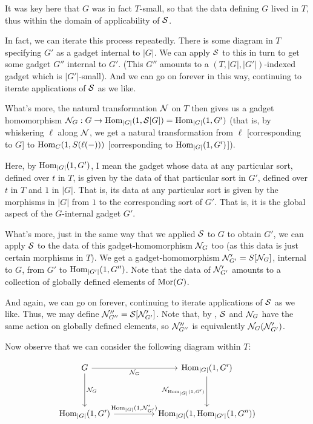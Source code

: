 \begin{observation}
It was key here that $G$ was in fact $T$-small, so that the data defining $G$ lived in $T$, thus within the domain of applicability of $\mathcal{S}$.

In fact, we can iterate this process repeatedly. There is some diagram in $T$ specifying $G'$ as a gadget internal to $|G|$. We can apply $\mathcal{S}$ to this in turn to get some gadget $G''$ internal to $G'$. (This $G''$ amounts to a $(T, |G|, |G'|)$-indexed gadget which is $|G'|$-small). And we can go on forever in this way, continuing to iterate applications of $\mathcal{S}$ as we like.

What's more, the natural transformation $\mathcal{N}$ on $T$ then gives us a gadget homomorphism $\mathcal{N}_G : G \to \operatorname{Hom}_{|G|}(1, \mathcal{S}[G]) = \operatorname{Hom}_{|G|}(1, G')$ (that is, by whiskering $\ell$ along $\mathcal{N}$, we get a natural transformation from $\ell$ [corresponding to $G$] to $\operatorname{Hom}_C(1, S(\ell(-)))$ [corresponding to $\operatorname{Hom}_{|G|}(1, G')$]).

Here, by $\operatorname{Hom}_{|G|}(1, G')$, I mean the gadget whose data at any particular sort, defined over $t$ in $T$, is given by the data of that particular sort in $G'$, defined over $t$ in $T$ and $1$ in $|G|$. That is, its data at any particular sort is given by the morphisms in $|G|$ from $1$ to the corresponding sort of $G'$. That is, it is the global aspect of the $G$-internal gadget $G'$.

What's more, just in the same way that we applied $\mathcal{S}$ to $G$ to obtain $G'$, we can apply $\mathcal{S}$ to the data of this gadget-homomorphism $\mathcal{N}_G$ too (as this data is just certain morphisms in $T$). We get a gadget-homomorphism $\mathcal{N}'_{G'} = S[\mathcal{N}_G]$, internal to $G$, from $G'$ to $\operatorname{Hom}_{|G'|}(1, G'')$. Note that the data of $\mathcal{N}'_{G'}$ amounts to a collection of globally defined elements of $\operatorname{Mor}(G)$.

And again, we can go on forever, continuing to iterate applications of $\mathcal{S}$ as we like. Thus, we may define $\mathcal{N}''_{G''} = \mathcal{S}[\mathcal{N}'_{G'}]$. Note that, by , $\mathcal{S}$ and $\mathcal{N}_G$ have the same action on globally defined elements, so $\mathcal{N}''_{G''}$ is equivalently $\mathcal{N}_G(\mathcal{N}'_{G'})$.

Now observe that we can consider the following diagram within $T$:

\[\begin{tikzcd}
	G && {\Hom_{|G|}(1, G')} \\
	\\
	{\Hom_{|G|}(1, G')} && {\Hom_{|G|}(1, \Hom_{|G'|}(1, G''))}
	\arrow["\introN_G", from=1-1, to=3-1]
	\arrow["\introN_G"', from=1-1, to=1-3]
	\arrow["\introN_{\Hom_{|G|}(1, G')}"', from=1-3, to=3-3]
	\arrow["{\Hom_{|G|}(1, \introN'_{G'})}", from=3-1, to=3-3]
\end{tikzcd}\]


\end{observation}
